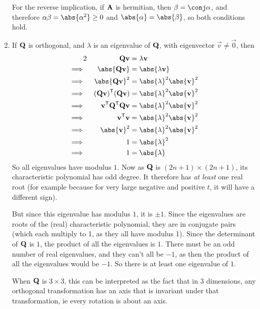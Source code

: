 \documentclass[fleqn,a4paper,11pt]{article}
\begin{document}
\begin{enumerate}[label=\textbf{\arabic*.}]
   For the reverse implication, if \(\mathbf{A}\) is hermitian, then
   \(\beta = \conj \alpha\), and therefore
   \(\alpha \beta = \abs{\alpha^2} \ge 0\)
   and \(\abs{\alpha} = \abs{\beta}\), so both conditions hold.
  \item
   If \(\mathbf{Q}\) is orthogonal, and \(\lambda\) is an eigenvalue of
   \(\mathbf{Q}\), with eigenvector \(\vec v \ne \vec 0\), then
   \begin{alignat*}2
    &&\mat Q \vec v &= \lambda \vec v \\
    \implies{}&&
    \abs{\mat Q \vec v} &= \abs{\lambda \vec v} \\
    \implies{}&&
    \abs{\mat Q \vec v}^2 &= \abs{\lambda}^2 \abs{\vec v}^2 \\
    \implies{}&&
    \tran{(\mat Q \vec v)}(\mat Q \vec v) &= \abs{\lambda}^2 \abs{\vec v}^2 \\
    \implies{}&&
    \tran{\vec v}\tran{\mat Q}\mat Q \vec v &= \abs{\lambda}^2 \abs{\vec v}^2 \\
    \implies{}&&
    \tran{\vec v}\vec v &= \abs{\lambda}^2 \abs{\vec v}^2 \\
    \implies{}&&
    \abs{\vec v}^2 &= \abs{\lambda}^2 \abs{\vec v}^2 \\
    \implies{}&&
    1 &= \abs{\lambda}^2 \\
    \implies{}&&
    1 &= \abs{\lambda}
   \end{alignat*}
   So all eigenvalues have modulus \(1\). Now as \(\mathbf{Q}\) is
   \((2n + 1) \times (2n + 1)\), its characteristic polynomial has odd degree.
   It therefore has \emph{at least} one real root (for example because for very
   large negative and positive \(t\), it will have a different sign).

   But since this eigenvalue has modulus \(1\), it is \(\pm 1\). Since the
   eigenvalues are roots of the (real) characteristic polynomial, they are in
   conjugate pairs (which each multiply to 1, as they all have modulus 1). Since
   the determinant of \(\mathbf{Q}\) is \(1\), the product of all the eigenvalues is
   \(1\). There must be an odd number of real eigenvalues, and they can't all be
   \(-1\), as then the product of all the eigenvalues would be \(-1\). So there
   is at least one eigenvalue of \(1\).

   When \(\mathbf{Q}\) is \(3 \times 3\), this can be interpreted as the fact that
   in \(3\) dimensions, any orthogonal transformation has an axis that is
   invariant under that transformation, ie every rotation is about an axis.


\end{enumerate}
\end{document}
